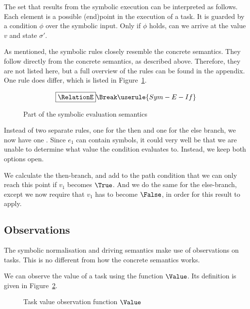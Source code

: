 The set that results from the symbolic execution can be interpreted as follows.
Each element is a possible (end)point in the execution of a task.
It is guarded by a condition $\phi$ over the symbolic input.
Only if $\phi$ holds, can we arrive at the value $v$ and state $\sigma'$.

As mentioned, the symbolic rules closely resemble the concrete semantics.
They follow directly from the concrete semantics, as described above.
Therefore, they are not listed here, but a full overview of the rules can be found in the appendix.
One rule does differ, which is listed in Figure~\ref{fig:eval}.

\begin{figure}[h]
  \small
  \begin{gather*}
    \boxed{\RelationE} \Break
    \userule{Sym-E-If}
  \end{gather*}
  \caption{Part of the symbolic evaluation semantics}
  \label{fig:eval}
\end{figure}

Instead of two separate rules, one for the then and one for the else branch, we now have one .
Since $e_1$ can contain symbols, it could very well be that we are unable to determine what value the condition evaluates to.
Instead, we keep both options open.

We calculate the then-branch, and add to the path condition that we can only reach this point if $v_1$ becomes $\True$.
And we do the same for the else-branch, except we now require that $v_1$ has to become $\False$, in order for this result to apply.

\subsection{Observations}
\label{subsec:observations}
The symbolic normalisation and driving semantics make use of observations on tasks.
This is no different from how the concrete \TOPHAT semantics works.

We can observe the value of a task using the function $\Value$.
Its definition is given in Figure~\ref{fig:value}.

\begin{figure}[h]
  \small
  \begin{center}
  \end{center}
  \caption{Task value observation function $\Value$}
  \label{fig:value}
\end{figure}

